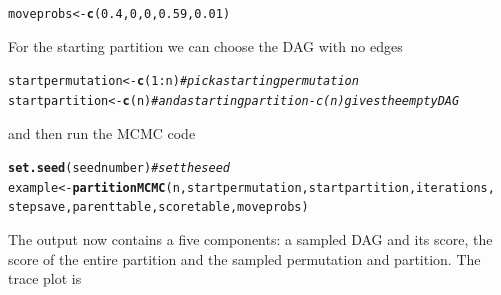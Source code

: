 \documentclass[a4paper]{article}\usepackage[]{graphicx}\usepackage[]{color}
\makeatletter
\newcommand{\hlnum}[1]{\textcolor[rgb]{0.686,0.059,0.569}{#1}}%
\newcommand{\hlcom}[1]{\textcolor[rgb]{0.678,0.584,0.686}{\textit{#1}}}%
\newcommand{\hlopt}[1]{\textcolor[rgb]{0,0,0}{#1}}%
\newcommand{\hlstd}[1]{\textcolor[rgb]{0.345,0.345,0.345}{#1}}%
\newcommand{\hlkwb}[1]{\textcolor[rgb]{0.69,0.353,0.396}{#1}}%
\newcommand{\hlkwd}[1]{\textcolor[rgb]{0.737,0.353,0.396}{\textbf{#1}}}%
\newenvironment{kframe}{%
 \def\at@end@of@kframe{}%
 \ifinner\ifhmode%
  \def\at@end@of@kframe{\end{minipage}}%
  \begin{minipage}{\columnwidth}%
 \fi\fi%
 \def\FrameCommand##1{\hskip\@totalleftmargin \hskip-\fboxsep
 \colorbox{shadecolor}{##1}\hskip-\fboxsep
     \hskip-\linewidth \hskip-\@totalleftmargin \hskip\columnwidth}%
 \MakeFramed {\advance\hsize-\width
   \@totalleftmargin\z@ \linewidth\hsize
   \@setminipage}}%
 {\par\unskip\endMakeFramed%
 \at@end@of@kframe}
\newenvironment{knitrout}{}{} %
\newcommand{\nn}{\noindent}
\makeatother
\begin{document}
\begin{knitrout}
\color{fgcolor}\begin{kframe}
\begin{alltt}
\hlstd{moveprobs} \hlkwb{<-} \hlkwd{c}\hlstd{(}\hlnum{0.4}\hlstd{,} \hlnum{0}\hlstd{,} \hlnum{0}\hlstd{,} \hlnum{0.59}\hlstd{,} \hlnum{0.01}\hlstd{)}
\end{alltt}
\end{kframe}
\end{knitrout}

\nn For the starting partition we can choose the DAG with no edges

\begin{knitrout}
\color{fgcolor}\begin{kframe}
\begin{alltt}
\hlstd{startpermutation} \hlkwb{<-} \hlkwd{c}\hlstd{(}\hlnum{1}\hlopt{:}\hlstd{n)}  \hlcom{# pick a starting permutation}
\hlstd{startpartition} \hlkwb{<-} \hlkwd{c}\hlstd{(n)}  \hlcom{# and a starting partition - c(n) gives the empty DAG}
\end{alltt}
\end{kframe}
\end{knitrout}

\nn and then run the MCMC code

\begin{knitrout}
\color{fgcolor}\begin{kframe}
\begin{alltt}
\hlkwd{set.seed}\hlstd{(seednumber)}  \hlcom{# set the seed}
\hlstd{example} \hlkwb{<-} \hlkwd{partitionMCMC}\hlstd{(n, startpermutation, startpartition, iterations,}
    \hlstd{stepsave, parenttable, scoretable, moveprobs)}
\end{alltt}
\end{kframe}
\end{knitrout}

\nn The output now contains a five components: a sampled DAG and its score, the score of the entire partition and the sampled permutation and partition.  The trace plot is
\end{document}
